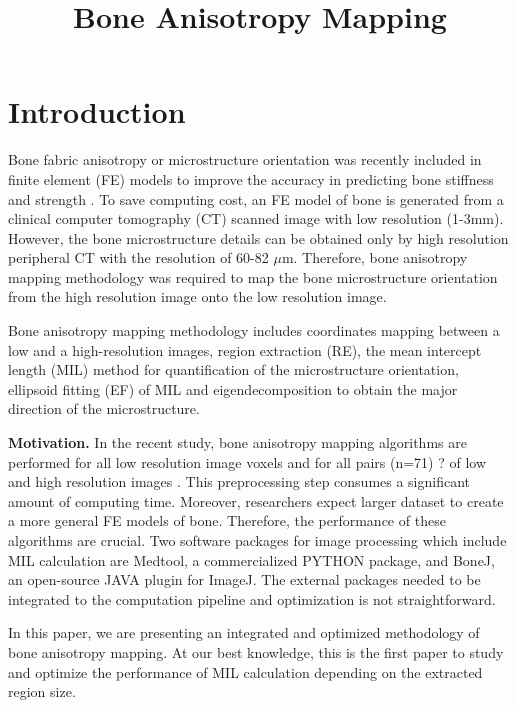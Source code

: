 \documentclass[letterpaper]{article}
\title{Bone Anisotropy Mapping}
\newcommand{\mypar}[1]{{\bf #1.}}
\begin{document}
%
\maketitle
%

\begin{abstract}
\color{red}{Todo}
\end{abstract}

\section{Introduction}\label{sec:intro}

Bone fabric anisotropy or microstructure orientation was recently included in finite element (FE) models to improve the accuracy in predicting bone stiffness and strength \cite{Maquer:2015, Musy:2017}. To save computing cost, an FE model of bone is generated from a clinical computer tomography (CT) scanned image with low resolution (1-3mm). However, the bone microstructure details can be obtained only by high resolution peripheral CT with the resolution of 60-82 $\mu$m. Therefore, bone anisotropy mapping methodology was required to map the bone microstructure orientation from the high resolution image onto the low resolution image.

Bone anisotropy mapping methodology includes coordinates mapping between a low and a high-resolution images, region extraction (RE), the mean intercept length (MIL) method for quantification of the microstructure orientation, ellipsoid fitting (EF) of MIL and eigendecomposition to obtain the major direction of the microstructure.

\mypar{Motivation} In the recent study, bone anisotropy mapping algorithms are performed for all low resolution image voxels and for all pairs (n=71) {\color{red} ?} of low and high resolution images \cite{Panyasantisuk:18}. This preprocessing step consumes a significant amount of computing time. Moreover, researchers expect larger dataset to create a more general FE models of bone. Therefore, the performance of these algorithms are crucial. Two software packages for image processing which include MIL calculation are Medtool, a commercialized PYTHON package, and BoneJ, an open-source JAVA plugin for ImageJ. The external packages needed to be integrated to the computation pipeline and optimization is not straightforward. 

In this paper, we are presenting an integrated and optimized methodology of bone anisotropy mapping. At our best knowledge, this is the first paper to study and optimize the performance of MIL calculation depending on the extracted region size.
  
\end{document}
